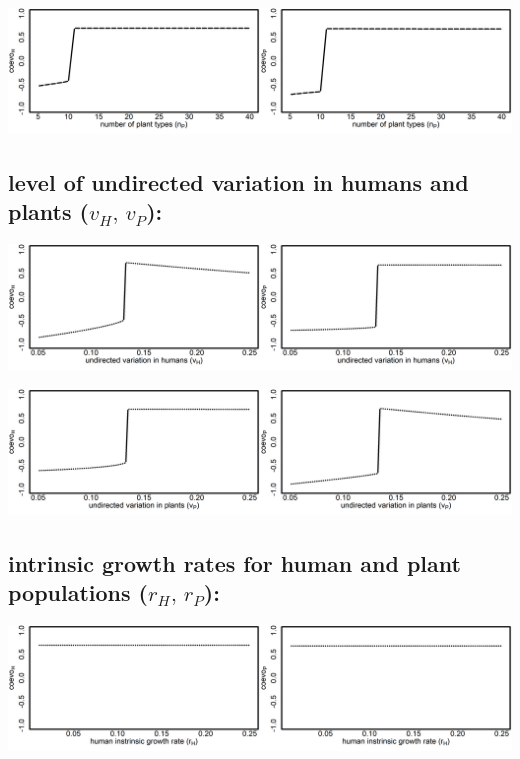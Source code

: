 \documentclass[
]{book}
\begin{document}
\includegraphics[width=1\linewidth]{plots/2_onePar-n.P_bifplot-pair}

\hypertarget{level-of-undirected-variation-in-humans-and-plants-v_hv_p}{%
\subsection{\texorpdfstring{level of undirected variation in humans and plants (\(v_{H},\,v_{P}\)):}{level of undirected variation in humans and plants (v\_\{H\},\textbackslash,v\_\{P\}):}}\label{level-of-undirected-variation-in-humans-and-plants-v_hv_p}}

\includegraphics[width=1\linewidth]{plots/2_onePar-v.H_bifplot-pair}

\includegraphics[width=1\linewidth]{plots/2_onePar-v.P_bifplot-pair}

\hypertarget{intrinsic-growth-rates-for-human-and-plant-populations-r_hr_p}{%
\subsection{\texorpdfstring{intrinsic growth rates for human and plant populations (\(r_{H},\,r_{P}\)):}{intrinsic growth rates for human and plant populations (r\_\{H\},\textbackslash,r\_\{P\}):}}\label{intrinsic-growth-rates-for-human-and-plant-populations-r_hr_p}}

\includegraphics[width=1\linewidth]{plots/2_onePar-r.H_bifplot-pair}
\end{document}
